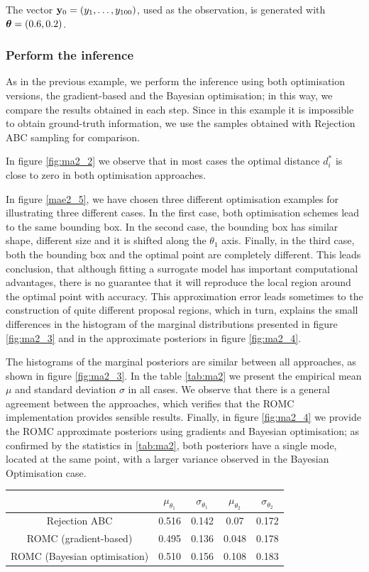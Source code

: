 The vector $\mathbf{y}_0 = (y_1, \ldots, y_{100})$, used as the observation,
is generated with $\boldsymbol{\theta}=(0.6, 0.2)$.


\subsubsection*{Perform the inference}

As in the previous example, we perform the inference using both
optimisation versions, the gradient-based and the Bayesian
optimisation; in this way, we compare the results obtained in each
step. Since in this example it is impossible to obtain ground-truth
information, we use the samples obtained with Rejection ABC sampling
for comparison.

In figure \ref{fig:ma2_2} we observe that in most cases the optimal
distance $d_i^*$ is close to zero in both optimisation approaches.

In figure \ref{mae2_5}, we have chosen three different optimisation
examples for illustrating three different cases. In the first case,
both optimisation schemes lead to the same bounding box. In the second
case, the bounding box has similar shape, different size and it is
shifted along the $\theta_1$ axis. Finally, in the third case, both
the bounding box and the optimal point are completely different. This
leads conclusion, that although fitting a surrogate model has
important computational advantages, there is no guarantee that it will
reproduce the local region around the optimal point with
accuracy. This approximation error leads sometimes to the construction
of quite different proposal regions, which in turn, explains the small
differences in the histogram of the marginal distributions presented
in figure \ref{fig:ma2_3} and in the approximate posteriors in figure
\ref{fig:ma2_4}.

The histograms of the marginal posteriors are similar between all
approaches, as shown in figure \ref{fig:ma2_3}. In the table
\ref{tab:ma2} we present the empirical mean $\mu$ and standard
deviation $\sigma$ in all cases. We observe that there is a general
agreement between the approaches, which verifies that the ROMC
implementation provides sensible results. Finally, in figure
\ref{fig:ma2_4} we provide the ROMC approximate posteriors using
gradients and Bayesian optimisation; as confirmed by the statistics in
\ref{tab:ma2}, both posteriors have a single mode, located at the same
point, with a larger variance observed in the Bayesian Optimisation
case.

\begin{center} \label{tab:ma2}
\begin{tabular}{ c|c|c|c|c }
\hline
& $\mu_{\theta_1}$ & $\sigma_{\theta_1}$ & $\mu_{\theta_2}$ & $\sigma_{\theta_2}$ \\
\hline \hline
Rejection ABC & 0.516 & 0.142 & 0.07 & 0.172 \\
\hline
ROMC (gradient-based) & 0.495 & 0.136 & 0.048 & 0.178 \\
\hline
ROMC (Bayesian optimisation) & 0.510 & 0.156 & 0.108 & 0.183 \\
\hline
\end{tabular}
\end{center}

